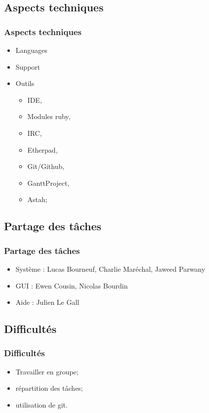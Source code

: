 \documentclass[12pt]{beamer}
\begin{document}
\subsection{Aspects techniques}
    \begin{frame}
    \frametitle{Aspects techniques}
    
        \begin{itemize}
            \item Languages
            \pause
            \item Support
            \pause
            \item Outils
            \begin{itemize}
                \item IDE,
                \item Modules ruby,
                \item IRC,
                \item Etherpad,
                \item Git/Github,
                \item GanttProject,
                \item Astah;
            \end{itemize}
                    
        \end{itemize}
\end{frame}

\subsection{Partage des tâches}
    \begin{frame}
    \frametitle{Partage des tâches}
        \begin{itemize}
            \item Système : Lucas Bourneuf, Charlie Maréchal, Jaweed Parwany
            \smallskip
            \smallskip
            \item GUI : Ewen Cousin, Nicolas Bourdin
            \smallskip
            \smallskip
            \item Aide : Julien Le Gall
        \end{itemize}
    \end{frame}


\subsection{Difficultés}
    \begin{frame}
    \frametitle{Difficultés}
        \begin{itemize}
          \item Travailler en groupe;
          \smallskip
          \smallskip
          \item répartition des tâches;
          \smallskip
          \smallskip
          \item utilisation de git.
        \end{itemize}
    \end{frame}
\end{document}
